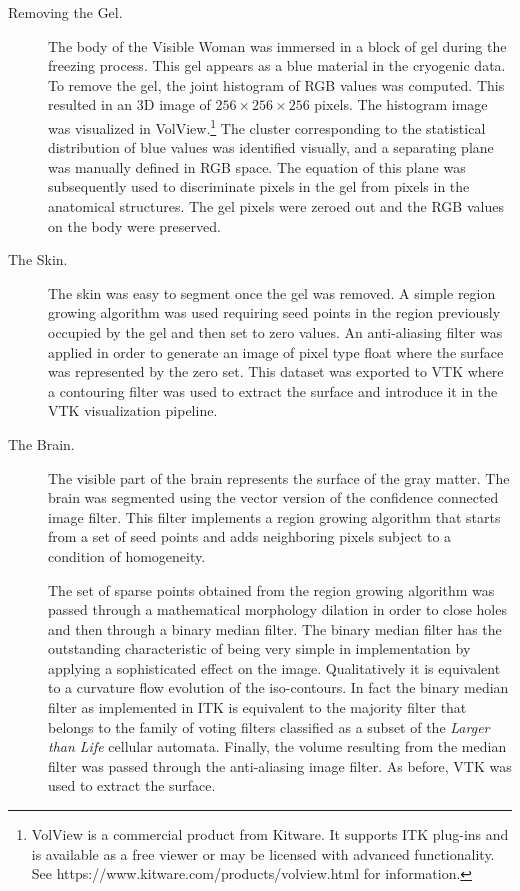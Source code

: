\begin{description}

\item [Removing the Gel.]
The body of the Visible Woman was immersed in a block of gel during the
freezing process. This gel appears as a blue material in the cryogenic data.
To remove the gel, the joint histogram of RGB values was computed. This
resulted in an 3D image of $256\times256\times256$ pixels. The histogram
image was visualized in VolView.\footnote{VolView is a commercial product
from Kitware. It supports ITK plug-ins and is available as a free viewer or
may be licensed with advanced functionality. See
https://www.kitware.com/products/volview.html for information.} The cluster
corresponding to the statistical distribution of blue values was identified
visually, and a separating plane was manually defined in RGB space. The
equation of this plane was subsequently used to discriminate pixels in the
gel from pixels in the anatomical structures. The gel pixels were zeroed out
and the RGB values on the body were preserved.

\item[The Skin.]
The skin was easy to segment once the gel was removed. A simple region
growing algorithm was used requiring seed points in the region previously
occupied by the gel and then set to zero values. An anti-aliasing filter was
applied in order to generate an image of pixel type float where the surface
was represented by the zero set. This dataset was exported to VTK where a
contouring filter was used to extract the surface and introduce it in the VTK
visualization pipeline.

\item[The Brain.]
The visible part of the brain represents the surface of the gray matter.  The
brain was segmented using the vector version of the confidence connected
image filter.  This filter implements a region growing algorithm that starts
from a set of seed points and adds neighboring pixels subject to a condition
of homogeneity.

The set of sparse points obtained from the region growing algorithm was
passed through a mathematical morphology dilation in order to close holes and
then through a binary median filter. The binary median filter has the
outstanding characteristic of being very simple in implementation by applying
a sophisticated effect on the image. Qualitatively it is equivalent to a
curvature flow evolution of the iso-contours. In fact the binary median
filter as implemented in ITK is equivalent to the majority filter that
belongs to the family of voting filters classified as a subset of the
\emph{Larger than Life} cellular automata. Finally, the volume resulting from
the median filter was passed through the anti-aliasing image filter. As
before, VTK was used to extract the surface.


\end{description}
